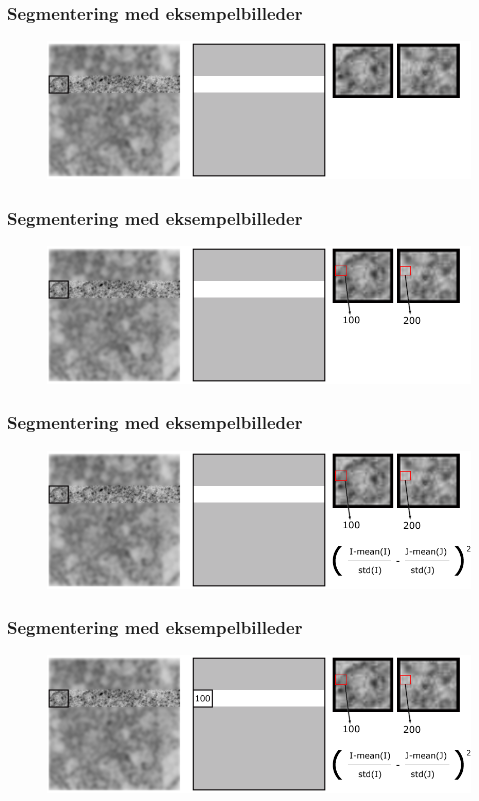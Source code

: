 \documentclass[12pt,t]{beamer}
\begin{document}
\begin{frame}
\frametitle{Segmentering med eksempelbilleder}
\begin{figure}[H]
\includegraphics[scale=0.35]{img/afstand/6.png}
\end{figure}
\end{frame}


\begin{frame}
\frametitle{Segmentering med eksempelbilleder}
\begin{figure}[H]
\includegraphics[scale=0.35]{img/afstand/7.png}
\end{figure}
\end{frame}


\begin{frame}
\frametitle{Segmentering med eksempelbilleder}
\begin{figure}[H]
\includegraphics[scale=0.35]{img/afstand/8.png}
\end{figure}
\end{frame}

\begin{frame}
\frametitle{Segmentering med eksempelbilleder}
\begin{figure}[H]
\includegraphics[scale=0.35]{img/afstand/9.png}
\end{figure}
\end{frame}
\end{document}
